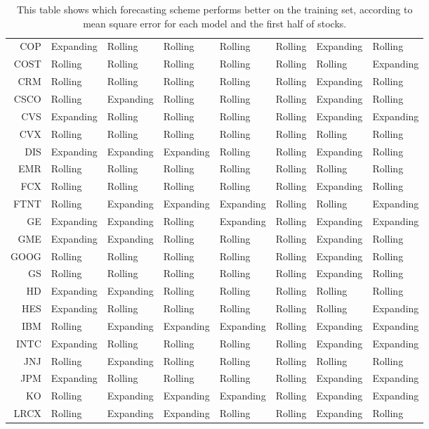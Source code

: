 \begin{table}[ht]
\begin{tabular}{rlllllll}
  COP & Expanding & Rolling & Rolling & Rolling & Rolling & Expanding & Rolling \\ 
  COST & Rolling & Rolling & Rolling & Rolling & Rolling & Rolling & Expanding \\ 
  CRM & Rolling & Rolling & Rolling & Rolling & Rolling & Expanding & Rolling \\ 
  CSCO & Rolling & Expanding & Rolling & Rolling & Rolling & Expanding & Rolling \\ 
  CVS & Expanding & Rolling & Rolling & Rolling & Rolling & Expanding & Expanding \\ 
  CVX & Rolling & Rolling & Rolling & Rolling & Rolling & Rolling & Rolling \\ 
  DIS & Expanding & Expanding & Expanding & Rolling & Rolling & Expanding & Rolling \\ 
  EMR & Rolling & Rolling & Rolling & Rolling & Rolling & Rolling & Rolling \\ 
  FCX & Rolling & Rolling & Rolling & Rolling & Rolling & Expanding & Rolling \\ 
  FTNT & Rolling & Expanding & Expanding & Expanding & Rolling & Rolling & Expanding \\ 
  GE & Expanding & Expanding & Rolling & Expanding & Rolling & Expanding & Expanding \\ 
  GME & Expanding & Expanding & Rolling & Rolling & Rolling & Expanding & Rolling \\ 
  GOOG & Rolling & Rolling & Rolling & Rolling & Rolling & Expanding & Rolling \\ 
  GS & Rolling & Rolling & Rolling & Rolling & Rolling & Expanding & Rolling \\ 
  HD & Expanding & Expanding & Rolling & Rolling & Rolling & Rolling & Rolling \\ 
  HES & Expanding & Rolling & Rolling & Rolling & Rolling & Rolling & Expanding \\ 
  IBM & Rolling & Expanding & Expanding & Expanding & Rolling & Expanding & Expanding \\ 
  INTC & Expanding & Rolling & Rolling & Rolling & Rolling & Expanding & Expanding \\ 
  JNJ & Rolling & Expanding & Rolling & Rolling & Rolling & Rolling & Rolling \\ 
  JPM & Expanding & Rolling & Rolling & Rolling & Rolling & Expanding & Expanding \\ 
  KO & Rolling & Expanding & Expanding & Expanding & Rolling & Expanding & Expanding \\ 
  LRCX & Rolling & Expanding & Expanding & Rolling & Rolling & Expanding & Rolling \\ 
   \hline
\end{tabular}
\caption[Better scheme MSE (1)]{This table shows which forecasting scheme performs better on the training set, according to mean square error 
              for each model and the first half of stocks.} 
\label{Table:Better_MSE_1}
\end{table}
